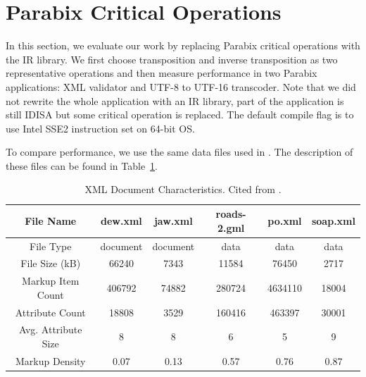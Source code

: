 \section{Parabix Critical Operations}
In this section, we evaluate our work by replacing Parabix critical operations with the IR library. We first choose transposition and inverse transposition as two representative operations and then measure performance in two Parabix applications: XML validator and UTF-8 to UTF-16 transcoder. Note that we did not rewrite the whole application with an IR library, part of the application is still IDISA but some critical operation is replaced. The default compile flag is to use Intel SSE2 instruction set on 64-bit OS.

To compare performance, we use the same data files used in \cite{rob_xml}. The description of these files can be found in Table~\ref{table:xmlwf_data}.

\begin{table}[h]
\centering
\begin{tabular}{|c|c|c|c|c|c|}
\hline
File Name           & dew.xml & jaw.xml & roads-2.gml & po.xml  & soap.xml \\ \hline
File Type           & document   & document   & data      & data    & data     \\ \hline
File Size (kB)      & 66240      & 7343       & 11584     & 76450   & 2717     \\ \hline
Markup Item Count   & 406792     & 74882      & 280724    & 4634110 & 18004    \\ \hline
Attribute Count     & 18808      & 3529       & 160416    & 463397  & 30001    \\ \hline
Avg. Attribute Size & 8          & 8          & 6         & 5       & 9        \\ \hline
Markup Density      & 0.07       & 0.13       & 0.57      & 0.76    & 0.87     \\ \hline
\end{tabular}
\caption{XML Document Characteristics. Cited from \cite{rob_xml}.}
\label{table:xmlwf_data}
\end{table}

